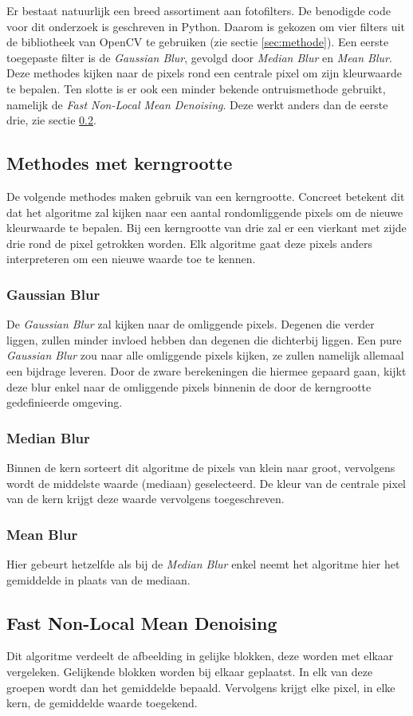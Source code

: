 Er bestaat natuurlijk een breed assortiment aan fotofilters. De benodigde code voor dit onderzoek is geschreven in Python. Daarom is gekozen om vier filters uit de bibliotheek van OpenCV te gebruiken (zie sectie \ref{sec:methode}).  Een eerste toegepaste filter is de \textit{Gaussian Blur}, gevolgd door \textit{Median Blur} en \textit{Mean Blur}. Deze methodes kijken naar de pixels rond een centrale pixel om zijn kleurwaarde te bepalen. Ten slotte is er ook een minder bekende ontruismethode gebruikt, namelijk de \textit{Fast Non-Local Mean Denoising}. Deze werkt anders dan de eerste drie, zie sectie \ref{subsec:fnlmd}.

\subsection{Methodes met kerngrootte}
De volgende methodes maken gebruik van een kerngrootte. Concreet betekent dit dat het algoritme zal kijken naar een aantal rondomliggende pixels om de nieuwe kleurwaarde te bepalen. Bij een kerngrootte van drie zal er een vierkant met zijde drie rond de pixel getrokken worden. Elk algoritme gaat deze pixels anders interpreteren om een nieuwe waarde toe te kennen.
\subsubsection{Gaussian Blur}
De {\it Gaussian Blur} zal kijken naar de omliggende pixels. Degenen die verder liggen, zullen minder invloed hebben dan degenen die dichterbij liggen. Een pure {\it Gaussian Blur} zou naar alle omliggende pixels kijken, ze zullen namelijk allemaal een bijdrage leveren. Door de zware berekeningen die hiermee gepaard gaan, kijkt deze blur enkel naar de omliggende pixels binnenin de door de kerngrootte gedefinieerde omgeving. \cite{gaussianBlur}

\subsubsection{Median Blur}
Binnen de kern sorteert dit algoritme de pixels van klein naar groot, vervolgens wordt de middelste waarde (mediaan) geselecteerd. De kleur van de centrale pixel van de kern krijgt deze waarde vervolgens toegeschreven.

\subsubsection{Mean Blur}
Hier gebeurt hetzelfde als bij de {\it Median Blur} enkel neemt het algoritme hier het gemiddelde in plaats van de mediaan.

\subsection{Fast Non-Local Mean Denoising}
\label{subsec:fnlmd}
Dit algoritme verdeelt de afbeelding in gelijke blokken, deze worden met elkaar vergeleken. Gelijkende blokken worden bij elkaar geplaatst. In elk van deze groepen wordt dan het gemiddelde bepaald. Vervolgens krijgt elke pixel, in elke kern, de gemiddelde waarde toegekend. \cite{fastExplanation}